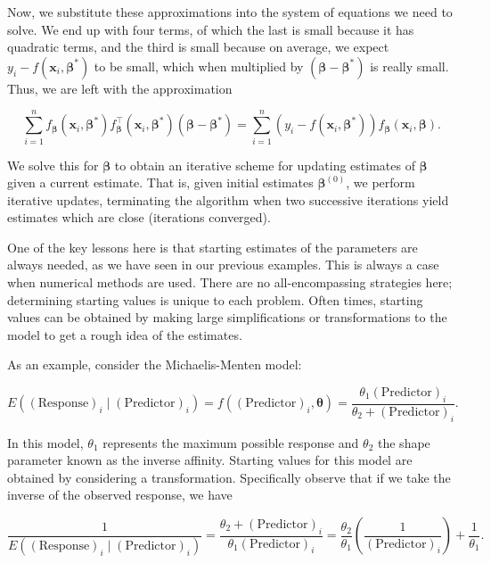 \documentclass[
]{book}
\theoremstyle{plain}
\theoremstyle{mydefn}
\theoremstyle{myexmpl}
\theoremstyle{remark}
\begin{document}
Now, we substitute these approximations into the system of equations we need to solve. We end up with four terms, of which the last is small because it has quadratic terms, and the third is small because on average, we expect \(y_i - f(\mathbf{x}_i,\boldsymbol{\beta}^*)\) to be small, which when multiplied by \((\boldsymbol{\beta} - \boldsymbol{\beta}^*)\) is really small. Thus, we are left with the approximation

\[
  \sum\limits_{i=1}^{n} f_{\boldsymbol{\beta}}\left(\mathbf{x}_i,\boldsymbol{\beta}^*\right)f_{\boldsymbol{\beta}}^\top\left(\mathbf{x}_i,\boldsymbol{\beta}^*\right)\left(\boldsymbol{\beta}-\boldsymbol{\beta}^*\right) = \sum\limits_{i=1}^{n} \left(y_i - f(\mathbf{x}_i,\boldsymbol{\beta}^*)\right)f_{\boldsymbol{\beta}}(\mathbf{x}_i,\boldsymbol{\beta}).
\]

We solve this for \(\boldsymbol{\beta}\) to obtain an iterative scheme for updating estimates of \(\boldsymbol{\beta}\) given a current estimate. That is, given initial estimates \(\boldsymbol{\beta}^{(0)}\), we perform iterative updates, terminating the algorithm when two successive iterations yield estimates which are close (iterations converged).

One of the key lessons here is that starting estimates of the parameters are always needed, as we have seen in our previous examples. This is always a case when numerical methods are used. There are no all-encompassing strategies here; determining starting values is unique to each problem. Often times, starting values can be obtained by making large simplifications or transformations to the model to get a rough idea of the estimates.

As an example, consider the Michaelis-Menten model:

\[E\left((\text{Response})_i \mid (\text{Predictor})_i\right) = f\left((\text{Predictor})_i, \boldsymbol{\theta}\right) = \frac{\theta_1 (\text{Predictor})_i}{\theta_2 + (\text{Predictor})_i}.\]

In this model, \(\theta_1\) represents the maximum possible response and \(\theta_2\) the shape parameter known as the inverse affinity. Starting values for this model are obtained by considering a transformation. Specifically observe that if we take the inverse of the observed response, we have

\[\frac{1}{E\left((\text{Response})_i \mid (\text{Predictor})_i\right)} = \frac{\theta_2 + (\text{Predictor})_i}{\theta_1 (\text{Predictor})_i} = \frac{\theta_2}{\theta_1} \left(\frac{1}{(\text{Predictor})_i}\right) + \frac{1}{\theta_1}.\]
\end{document}
